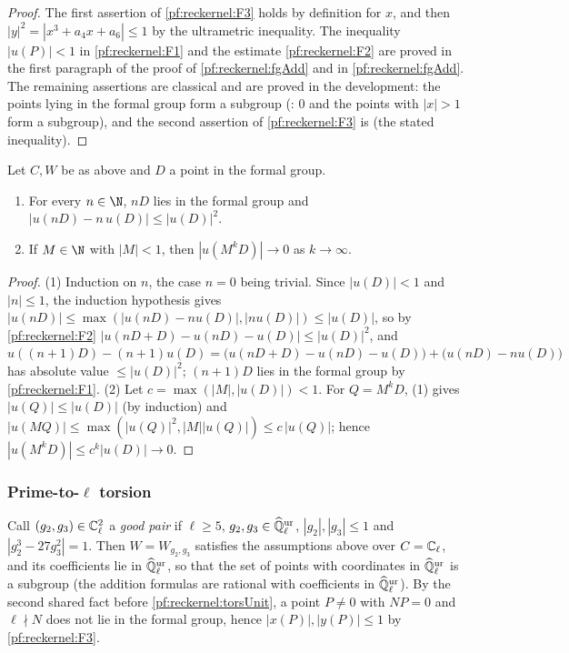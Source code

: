 \begin{proof}
The first assertion of \ref{pf:reckernel:F3} holds by definition for $x$, and then $|y|^2=|x^3+a_4x+a_6|\le1$ by
the ultrametric inequality. The inequality $|u(P)|<1$ in \ref{pf:reckernel:F1} and the estimate
\ref{pf:reckernel:F2} are proved in the first paragraph of the proof of \cref{pf:reckernel:fgAdd} and in
\cref{pf:reckernel:fgAdd}. The remaining assertions are classical \cite[Ch.~IV and \S VII.2]{Silverman2009} and are
proved in the development: the points lying in the formal group form a subgroup
(: $0$ and the points with $|x|>1$ form a subgroup), and the
second assertion of \ref{pf:reckernel:F3} is
 (the stated inequality).
\end{proof}

\begin{lemma}\label{pf:reckernel:fgEst}
Let $C,W$ be as above and $D$ a point in the formal group.
\begin{enumerate}
\item For every $n\in\N$, $nD$ lies in the formal group and $|u(nD)-n\,u(D)|\le|u(D)|^2$.
\item If $M\in\N$ with $|M|<1$, then $|u(M^kD)|\to0$ as $k\to\infty$.
\end{enumerate}
\end{lemma}

\begin{proof}
(1) Induction on $n$, the case $n=0$ being trivial. Since $|u(D)|<1$ and $|n|\le1$, the induction hypothesis gives
$|u(nD)|\le\max(|u(nD)-nu(D)|,|nu(D)|)\le|u(D)|$, so by \ref{pf:reckernel:F2}
$|u(nD+D)-u(nD)-u(D)|\le|u(D)|^2$, and
$u((n+1)D)-(n+1)u(D)=\bigl(u(nD+D)-u(nD)-u(D)\bigr)+\bigl(u(nD)-nu(D)\bigr)$ has absolute value $\le|u(D)|^2$;
$(n+1)D$ lies in the formal group by \ref{pf:reckernel:F1}.
(2) Let $c=\max(|M|,|u(D)|)<1$. For $Q=M^kD$, (1) gives $|u(Q)|\le|u(D)|$ (by induction) and
$|u(MQ)|\le\max(|u(Q)|^2,|M||u(Q)|)\le c\,|u(Q)|$; hence $|u(M^kD)|\le c^k|u(D)|\to0$.
\end{proof}

\subsubsection{Prime-to-$\ell$ torsion}
Call $(g_2,g_3)\in\mathbb{C}_\ell^2$ a \emph{good pair} if $\ell\ge5$, $g_2,g_3\in\widehat{\mathbb{Q}}{}_\ell^{\mathrm{ur}}$, $|g_2|,|g_3|\le1$ and
$|g_2^3-27g_3^2|=1$. Then $W=W_{g_2,g_3}$ satisfies the assumptions above over $C=\mathbb{C}_\ell$, and its coefficients lie
in $\widehat{\mathbb{Q}}{}_\ell^{\mathrm{ur}}$, so that the set of points with coordinates in $\widehat{\mathbb{Q}}{}_\ell^{\mathrm{ur}}$ is a subgroup (the addition formulas are
rational with coefficients in $\widehat{\mathbb{Q}}{}_\ell^{\mathrm{ur}}$). By the second shared fact before
\cref{pf:reckernel:torsUnit}, a point $P\ne0$ with $NP=0$ and $\ell\nmid N$ does not lie in the formal group, hence
$|x(P)|,|y(P)|\le1$ by \ref{pf:reckernel:F3}.

